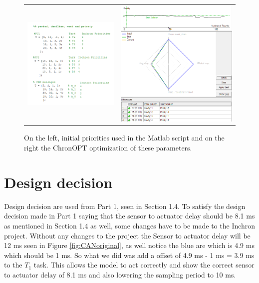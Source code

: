 \begin{figure}[h!]
	\begin{center}
		\begin{tabular}{cc}
		\includegraphics[width=0.5\linewidth]{img/inchron-prios} & \includegraphics[width=0.5\linewidth]{img/optimized}	\\
		\end{tabular}
		\caption{On the left, initial priorities used in the Matlab script and on the right the ChronOPT optimization of these parameters. }
		\label{fig:inchronprios}
	\end{center}
\end{figure}


\section{Design decision}
Design decision are used from Part 1, seen in Section 1.4. To satisfy the design decision made in Part 1 saying that the sensor to actuator delay should be 8.1 ms as mentioned in Section 1.4 as well, some changes have to be made to the Inchron project. Without any changes to the project the Sensor to actuator delay will be 12 ms seen in Figure \ref{fig:CANoriginal}, as well notice the blue are which is 4.9 ms which should be 1 ms. So what we did was add a offset of 4.9 ms - 1 ms = 3.9 ms to the $T_1$ task. This allows the model to act correctly and show the correct sensor to actuator delay of 8.1 ms and also lowering the sampling period to 10 ms.


